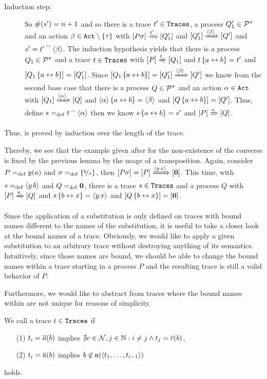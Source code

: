\begin{prf}
\begin{description}
\item[Induction step:] So $\#(s')=n+1$ and so there is a trace $t'\in\mathtt{Traces}$, a process $Q_1'\in\mathcal P^{\pi}$ and an action $\beta\in\actions\setminus\set{\tau}$ with $\left[P\sigma\right]\xRightarrow{t'}\left[Q_1'\right]$ and $\left[Q_1'\right]\xRightarrow{\langle\beta\rangle}\left[Q'\right]$ and $s'={t'}^{\,\frown{}\,}{\langle\beta\rangle}$. The induction hypothesis yields that there is a process $Q_1\in\mathcal P^{\pi}$ and a trace $t\in\mathtt{Traces}$ with $\left[P\right]\xRightarrow{t}\left[Q_1\right]$ and $t\left\{a\leftrightarrow{}b\right\}=t'$ and $\left[Q_1\left\{a\leftrightarrow{}b\right\}\right]=\left[Q_1'\right]$. Since $\left[Q_1\left\{a\leftrightarrow{}b\right\}\right]=\left[Q_1'\right]\xRightarrow{\langle\beta\rangle}\left[Q'\right]$ we know from the second base case that there is a process $Q\in\mathcal P^{\pi}$ and an action $\alpha\in\mathtt{Act}$ with $\left[Q_1\right]\xRightarrow{\langle\alpha\rangle}\left[Q\right]$ and $\langle\alpha\rangle\left\{a\leftrightarrow{}b\right\}=\langle\beta\rangle$ and $\left[Q\left\{a\leftrightarrow{}b\right\}\right]=\left[Q'\right]$. Thus, define $s=_{\mathrm{def}}{}{t}^{\,\frown{}\,}{\langle\alpha\rangle}$ then we know $s\left\{a\leftrightarrow{}b\right\}=s'$ and $\left[P\right]\xRightarrow{s}\left[Q\right]$.
\end{description}
Thus,  is proved by induction over the length of the trace.
\end{prf}

Thereby, we see that the example given after  for the non-existence of the converse is fixed by the previous lemma by the usage of a transposition. Again, consider $P=_{\mathrm{def}}y(a)$ and $\sigma=_{\mathrm{def}}\left\{\nicefrac{b}{x}\right\}$, then $\left[P\sigma\right]=\left[P\right]\xRightarrow{\langle y\,x\rangle}\left[\mathbf{0}\right]$. This time, with $s=_{\mathrm{def}}\langle y\,b\rangle$ and $Q=_{\mathrm{def}}\mathbf{0}$, there is a trace $s\in\mathtt{Traces}$ and a process $Q$ with $\left[P\right]\xRightarrow{s}\left[Q\right]$ and $s\left\{b\leftrightarrow{}x\right\}=\langle y\,x\rangle$ and $\left[Q\left\{b\leftrightarrow{}x\right\}\right]=\left[\mathbf{0}\right]$.

Since the application of a substitution is only defined on traces with bound names different to the names of the substitution, it is useful to take a closer look at the bound names of a trace. Obviously, we would like to apply a given substitution to an arbitrary trace without destroying anything of its semantics. Intuitively, since those names are bound, we should be able to change the bound names within a trace starting in a process $P$ and the resulting trace is still a valid behavior of $P$.

Furthermore, we would like to abstract from traces where the bound names within are not unique for reasons of simplicity.

\begin{definition}
\label{def_unique_traces}
We call a trace $t\in\mathtt{Traces}$  if 
\begin{enumerate}
\item[(1)] $t_i=\overline{a}(b)$ implies $\nexists{}c\in\mathcal N,j\in\mathbb N: i\neq{}j \wedge t_j=\overline{c}(b)$,
\item[(2)] $t_i=\overline{a}(b)$ implies $b\not\in\mathtt{n}(\langle t_1,\ldots, t_{i-1}\rangle)$
\end{enumerate}
holds.
\end{definition}

